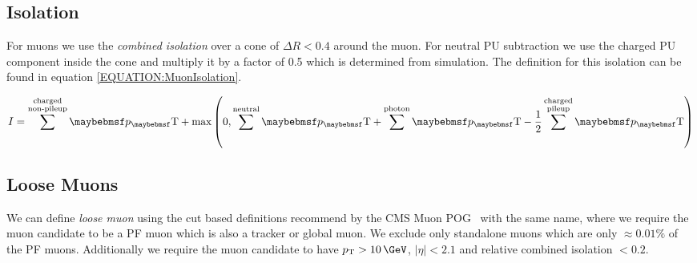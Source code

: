 \subsection{Isolation}
\label{SUBSECTION:EventReconstructionAndSimulation_LeptonIsolation_MuonsIsolation}



For muons we use the \textit{combined isolation} over a cone of $\Delta R < 0.4$ around the muon. For neutral \gls{PU} subtraction we use the charged \gls{PU} component inside the cone and multiply it by a factor of 0.5 which is determined from simulation. The definition for this isolation can be found in equation \ref{EQUATION:MuonIsolation}.

\begin{equation}
I = \sum^{\substack{\text{charged} \\ \text{non-pileup}}}\pT +
\text{max}\left(0,\sum^{\text{neutral}}\pT+\sum^{\text{photon}}\pT-\frac{1}{2}\sum^{\substack{\text{charged}
\\ \text{pileup}}}\pT\right)
\label{EQUATION:MuonIsolation}
\end{equation}


\subsection{Loose Muons}

%


We can define \textit{loose muon} using the cut based definitions recommend by the \gls{CMS} Muon \gls{POG}~\cite{ARTICLE:CMSPerformanceOfMuonID7TeV} with the same name, where we require the muon candidate to be a \gls{PF} muon which is also a tracker or global muon. We exclude only standalone muons which are only $\approx 0.01\%$ of the \gls{PF} muons. Additionally we require the muon candidate to have $\pt>10\,\GeV$, $|\eta|<2.1$ and relative combined isolation $<0.2$.

